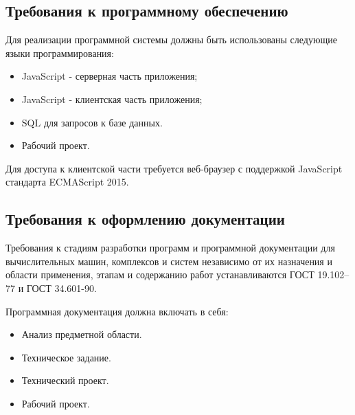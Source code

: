 \subsection{ Требования к программному обеспечению}

Для реализации программной системы должны быть использованы следующие языки программирования:

\begin{itemize}
	\item JavaScript - серверная часть приложения;
	\item JavaScript - клиентская часть приложения;
	\item SQL для запросов к базе данных.
	\item Рабочий проект.
\end{itemize}

Для доступа к клиентской части требуется веб-браузер с поддержкой
JavaScript стандарта ECMAScript 2015.

\subsection{Требования к оформлению документации}

Требования к стадиям разработки программ и программной документации для вычислительных машин, комплексов и систем независимо от их назначения и области применения, этапам и содержанию работ устанавливаются ГОСТ 19.102–77 и ГОСТ 34.601-90.

Программная документация должна включать в себя:

\begin{itemize}
	\item Анализ предметной области.
	\item Техническое задание.
	\item Технический проект.
	\item Рабочий проект.
\end{itemize}
